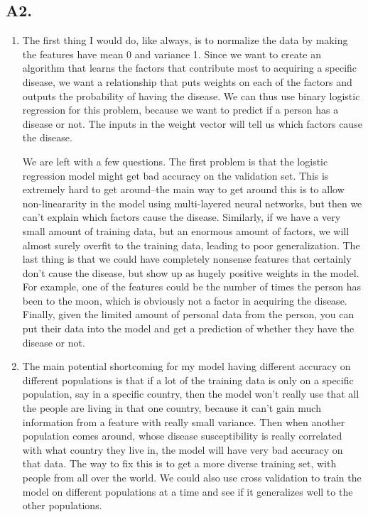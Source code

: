 \documentclass[12pt]{article}
\theoremstyle{definitionstyle}
\begin{document}
    \subsection*{A2.}
    \begin{enumerate}[label=\alph*.]
        \item The first thing I would do, like always, is to normalize the data by making the features have mean 0 and variance 1. Since we want to create an algorithm that learns the factors that contribute most to acquiring a specific disease, we want a relationship that puts weights on each of the factors and outputs the probability of having the disease. We can thus use binary logistic regression for this problem, because we want to predict if a person has a disease or not. The inputs in the weight vector will tell us which factors cause the disease. 
        
        We are left with a few questions. The first problem is that the logistic regression model might get bad accuracy on the validation set. This is extremely hard to get around--the main way to get around this is to allow non-lineararity in the model using multi-layered neural networks, but then we can't explain which factors cause the disease. Similarly, if we have a very small amount of training data, but an enormous amount of factors, we will almost surely overfit to the training data, leading to poor generalization. The last thing is that we could have completely nonsense features that certainly don't cause the disease, but show up as hugely positive weights in the model. For example, one of the features could be the number of times the person has been to the moon, which is obviously not a factor in acquiring the disease. Finally, given the limited amount of personal data from the person, you can put their data into the model and get a prediction of whether they have the disease or not. 

        \item The main potential shortcoming for my model having different accuracy on different populations is that if a lot of the training data is only on a specific population, say in a specific country, then the model won't really use that all the people are living in that one country, because it can't gain much information from a feature with really small variance. Then when another population comes around, whose disease susceptibility is really correlated with what country they live in, the model will have very bad accuracy on that data. The way to fix this is to get a more diverse training set, with people from all over the world. We could also use cross validation to train the model on different populations at a time and see if it generalizes well to the other populations. 
        

\end{enumerate}
\end{document}
